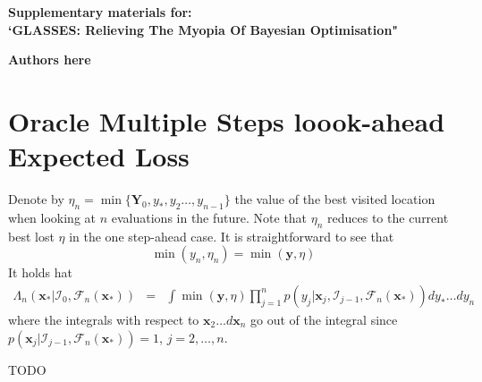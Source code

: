 \documentclass[twoside]{article}
\newcommand{\I}{\mathcal{I}}
\newcommand{\bx}{\textbf{x}}
\newcommand{\bY}{\textbf{Y}}
\newcommand{\by}{\textbf{y}}
\newcommand{\future}{\mathcal{F}}
\begin{document}



\newpage
\clearpage
\setcounter{section}{0}
\setcounter{equation}{0}
\renewcommand{\thesection}{S\arabic{section}}
\renewcommand{\theequation}{S.\arabic{equation}}
\onecolumn
\begin{center}
{\Large  \textbf{Supplementary materials for:\\
`GLASSES: Relieving The Myopia Of Bayesian Optimisation"}}
\end{center}
\begin{center}
\textbf{Authors here}
\end{center}

\section{Oracle Multiple Steps loook-ahead Expected Loss }
Denote by $\eta_n = \min \{\bY_0, y_*, y_2\dots,y_{n-1}\}$ the value of the best visited location when looking at $n$ evaluations in the future. Note that $\eta_n$ reduces to the current best lost $\eta$ in the one step-ahead case. It is straightforward to see that 
$$ \min (y_n,\eta_n) = \min (\by,\eta )$$
It holds hat
\begin{eqnarray}\label{eq:oracle_expected_nonmyopic_loss}
\Lambda_n(\bx_*|\I_0, \future_{n}(\bx_*)) & = & \int \min (\by,\eta) \prod_{j=1}^{n}p(y_{j}|\bx_{j},\I_{j-1}, \future_{n}(\bx_*)) dy_*\dots dy_n
\end{eqnarray}
where the integrals with respect to $\bx_2\dots d\bx_n$ go out of the integral since $p(\bx_{j}|\I_{j-1}, \future_{n}(\bx_*))=1$, $j=2,\dots,n$.

TODO
\end{document}
